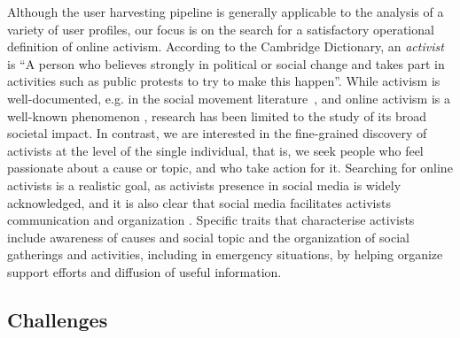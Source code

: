 Although the user harvesting pipeline is generally applicable to the analysis of a variety of user profiles, our focus is on the search for a satisfactory operational definition of online activism. 
%
According to the Cambridge Dictionary, an \textit{activist} is ``A person who believes strongly in political or social change and takes part in activities such as public protests to try to make this happen''.
%
While activism is well-documented, e.g. in the social movement literature~\cite{doi:10.1080/14742830701497277}, and online activism is a well-known phenomenon \cite{IJoC1246}, research has been limited to the study of its broad societal impact. 
In contrast, we are interested in the fine-grained discovery of activists at the level of the single individual, that is, we seek people who feel passionate about a cause or topic, and who take action for it. 
Searching for online activists is a realistic goal, as activists presence in social media is widely acknowledged, and it is also clear that social media facilitates activists communication and organization \cite{Poell2014,Youmans2012}. 
Specific traits that characterise activists include awareness of causes and social topic and the organization of social gatherings and activities, including in emergency situations, by helping organize support efforts and diffusion of useful information.
 

\subsection{Challenges}
 
